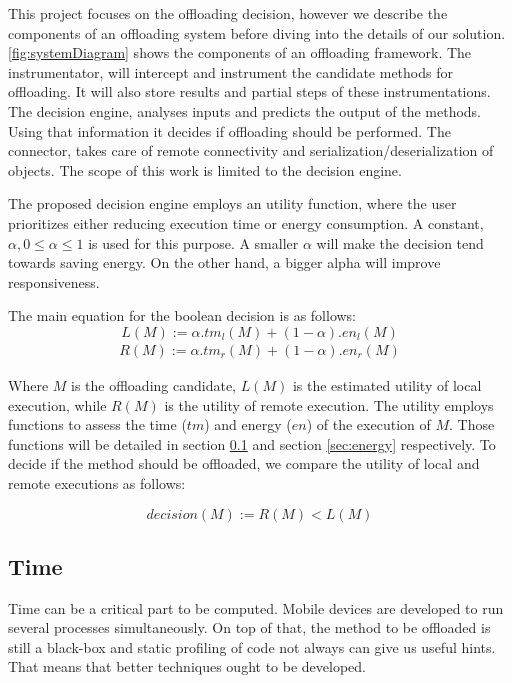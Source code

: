 \documentclass[10pt, conference, letterpaper]{IEEEtran}
\begin{document}
  This project focuses on the offloading decision, however we describe the components of an offloading system before diving into the details of our solution. \ref{fig:systemDiagram} shows the components of an offloading framework. The instrumentator, will intercept and instrument the candidate methods for offloading. It will also store results and partial steps of these instrumentations. The decision engine, analyses inputs and predicts the output of the methods. Using that information it decides if offloading should be performed. The connector, takes care of remote connectivity and serialization/deserialization of objects.  The scope of this work is limited to the decision engine.

  The proposed decision engine employs an utility function, where the user prioritizes either reducing execution time or energy consumption. A constant, $\alpha, 0 \leq \alpha \leq 1$ is used for this purpose. A smaller $\alpha$ will make the decision tend towards saving energy. On the other hand, a bigger alpha will improve responsiveness. 

  The main equation for the boolean decision is as follows:
  \begin{equation} \label{eq:localutility}
    L(M) := \alpha . tm_{l}(M) + (1-\alpha) . en_{l}(M) 
  \end{equation}
  \begin{equation} \label{eq:remoteutility}
  \begin{multlined}
    R(M) := \alpha . tm_{r}(M) + (1-\alpha) . en_{r}(M) 
  \end{multlined}
  \end{equation}

  Where $M$ is the offloading candidate, $L(M)$ is the estimated utility of local execution, while $R(M)$ is the utility of remote execution. The utility employs functions to assess the time ($tm$) and energy ($en$) of the execution of $M$. Those functions will be detailed in section \ref{sec:time} and section \ref{sec:energy} respectively. To decide if the method should be offloaded, we compare the utility of local and remote executions as follows: 

  \begin{equation}
    decision(M) := R(M) < L(M)
  \end{equation}

  \subsection{Time} \label{sec:time}
  Time can be a critical part to be computed. Mobile devices are developed to run several processes simultaneously. On top of that, the method to be offloaded is still a black-box and static profiling of code not always can give us useful hints. That means that better techniques ought to be developed.
  
\end{document}
